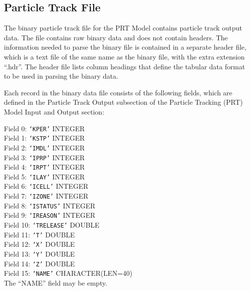 \newpage
\subsection{Particle Track File}

The binary particle track file for the PRT Model contains particle track output data.  The file
contains raw binary data and does not contain headers.  The information needed to parse the binary
file is contained in a separate header file, which is a text file of the same name as the binary
file, with the extra extension ``.hdr''.  The header file lists column headings that define the
tabular data format to be used in parsing the binary data.

Each record in the binary data file consists of the following fields, which are defined in the
Particle Track Output subsection of the Particle Tracking (PRT) Model Input and Output section:

\vspace{5mm}
\noindent Field 0: \texttt{`KPER'} {\color{red} \footnotesize{INTEGER}} \\
\noindent Field 1: \texttt{`KSTP'} {\color{red} \footnotesize{INTEGER}} \\
\noindent Field 2: \texttt{`IMDL'} {\color{red} \footnotesize{INTEGER}} \\
\noindent Field 3: \texttt{`IPRP'} {\color{red} \footnotesize{INTEGER}} \\
\noindent Field 4: \texttt{`IRPT'} {\color{red} \footnotesize{INTEGER}} \\
\noindent Field 5: \texttt{`ILAY'} {\color{red} \footnotesize{INTEGER}} \\
\noindent Field 6: \texttt{`ICELL'} {\color{red} \footnotesize{INTEGER}} \\
\noindent Field 7: \texttt{`IZONE'} {\color{red} \footnotesize{INTEGER}} \\
\noindent Field 8: \texttt{`ISTATUS'} {\color{red} \footnotesize{INTEGER}} \\
\noindent Field 9: \texttt{`IREASON'} {\color{red} \footnotesize{INTEGER}} \\
\noindent Field 10: \texttt{`TRELEASE'} {\color{red} \footnotesize{DOUBLE}} \\
\noindent Field 11: \texttt{`T'} {\color{red} \footnotesize{DOUBLE}} \\
\noindent Field 12: \texttt{`X'} {\color{red} \footnotesize{DOUBLE}} \\
\noindent Field 13: \texttt{`Y'} {\color{red} \footnotesize{DOUBLE}} \\
\noindent Field 14: \texttt{`Z'} {\color{red} \footnotesize{DOUBLE}} \\
\noindent Field 15: \texttt{`NAME'} {\color{red} \footnotesize{CHARACTER(LEN=40)}} \\

\vspace{4mm}
\noindent The ``NAME'' field may be empty.
